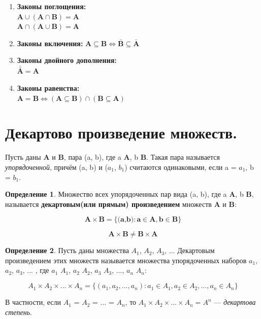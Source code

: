 \documentclass[12pt, a4paper, oneside]{article}
\theoremstyle{plain} %
\theoremstyle{definition}
\newtheorem*{definition}{Определение}  %
\newcommand{\indef}[1]{\textbf{ \color{dark_red} #1}}
\begin{document}
\begin{enumerate}
     \item \textbf{Законы поглощения:} \\
     \(\textbf{A} \cup (\textbf{A} \cap \textbf{B}) = \textbf{A}\) \\
     \(\textbf{A} \cap (\textbf{A} \cup \textbf{B}) = \textbf{A}\)
    
     \item \textbf{Законы включения:}
     \(\textbf{A} \subseteq \textbf{B} \Leftrightarrow \bar{\textbf{B}} \subseteq \bar{\textbf{A}} \)
    
     \item \textbf{Законы двойного дополнения:} \\
     \(\bar{\bar{\textbf{A}}} = \textbf{A}\)
    
     \item \textbf{Законы равенства:} \\
     \(\textbf{A} = \textbf{B} \Leftrightarrow (\textbf{A} \subseteq \textbf{B}) \cap (\textbf{B} \subseteq \textbf{A})\)
\end{enumerate}

\section{Декартово произведение множеств.}

Пусть даны \textbf{A} и \textbf{B}, пара (a, b), где a \in \hspace{2mm} \textbf{A}, b \in \hspace{2mm} \textbf{B}. Такая пара называется \emph{упорядоченной}, причём (a, b) и (\(a_1\), \(b_1\)) считаются одинаковыми, если a = \(a_1\), b = \(b_1\). 

\begin{definition}

Множество всех упорядоченных пар вида (a, b), где a \in \textbf{A}, b \in \textbf{B}, называется \indef{декартовым(или прямым) произведением} множеств \textbf{A} и \textbf{B}:

\[\textbf{A} \times \textbf{B} = \{\textbf{(a,b)}: \textbf{a} \in \textbf{A}, \textbf{b} \in \textbf{B}\}\]

\[\textbf{A} \times \textbf{B} \neq \textbf{B} \times \textbf{A}\]

\end{definition}

\begin{definition}

Пусть даны множества \textbf{\(A_1\)}, \textbf{\(A_2\)}, \textbf{\(A_3\)}, ... Декартовым произведением этих множеств называется множества упорядоченных наборов $a_1$, \(a_2\), \(a_3\), ... , где \(a_1\) \in \(A_1\), \(a_2\) \in \(A_2\), \(a_3\) \in \(A_3\), ..., \(a_n\) \in \(A_n\):

\[
A_1 \times A_2 \times ... \times A_n = \{(a_1, a_2, ... , a_n): a_1 \in A_1, a_2 \in A_2, ... , a_n \in A_n\}
\]

В частности, если \(A_1\) = \(A_2\) = ... = \(A_n\), то \hspace{1mm} \(A_1 \times A_2 \times ... \times A_n = A^n\) --- \emph{декартова степень}.
\end{definition}
\end{document}
